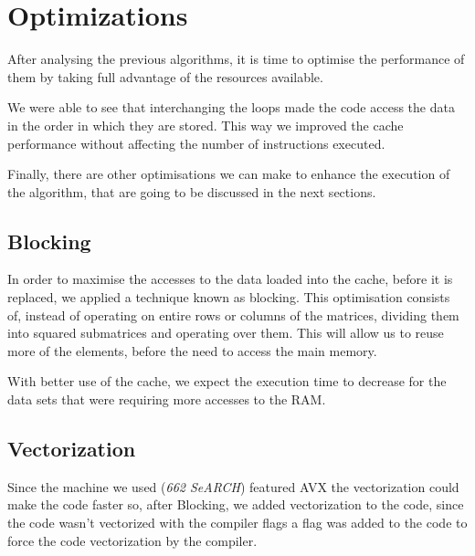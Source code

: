 \documentclass[twoside,twocolumn]{article}
\begin{document}

\section{Optimizations}

After analysing the previous algorithms, it is time to optimise the performance of them by taking full advantage of the resources available.

We were able to see that interchanging the loops made the code access the data in the order in which they are stored. This way we improved the cache performance without affecting the number of instructions executed.

Finally, there are other optimisations we can make to enhance the execution of the algorithm, that are going to be discussed in the next sections.

\subsection{Blocking}

In order to maximise the accesses to the data loaded into the cache, before it is replaced, we applied a technique known as blocking. This optimisation consists of, instead of operating on entire rows or columns of the matrices, dividing them into squared submatrices and operating over them. This will allow us to reuse more of the elements, before the need to access the main memory.

With better use of the cache, we expect the execution time to decrease for the data sets that were requiring more accesses to the RAM.

\subsection{Vectorization}

Since the machine we used (\textit{662 SeARCH}) featured AVX the vectorization could make the code faster so, after Blocking, we added vectorization to the code, since the code wasn't vectorized with the compiler flags a flag was added to the code to force the code vectorization by the compiler.





\printbibliography

\end{document}
